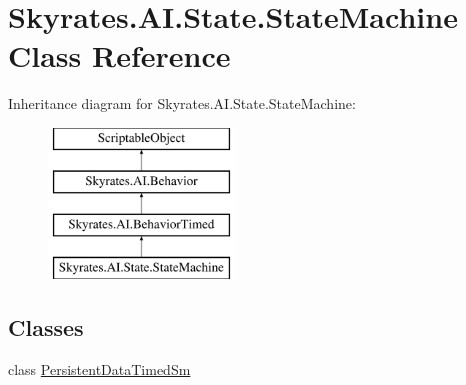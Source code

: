 \hypertarget{class_skyrates_1_1_a_i_1_1_state_1_1_state_machine}{\section{Skyrates.\-A\-I.\-State.\-State\-Machine Class Reference}
\label{class_skyrates_1_1_a_i_1_1_state_1_1_state_machine}
}


 


Inheritance diagram for Skyrates.\-A\-I.\-State.\-State\-Machine\-:\begin{figure}[H]
\begin{center}
\leavevmode
\includegraphics[height=4.000000cm]{class_skyrates_1_1_a_i_1_1_state_1_1_state_machine}
\end{center}
\end{figure}
\subsection*{Classes}
\begin{DoxyCompactItemize}
\item 
class \hyperlink{class_skyrates_1_1_a_i_1_1_state_1_1_state_machine_1_1_persistent_data_timed_sm}{Persistent\-Data\-Timed\-Sm}
\end{DoxyCompactItemize}
